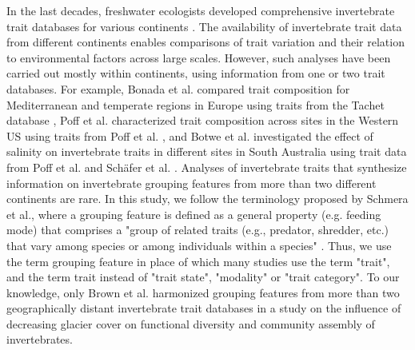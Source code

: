 \documentclass{article}
\begin{document}
In the last decades, freshwater ecologists developed comprehensive invertebrate trait databases for various continents \cite{usseglio-polatera_biomonitoring_2000, schmidt-kloiber_www.freshwaterecology.info_2015, vieira_database_nodate, Philips_and_Smith_NZ_DB_2018, kefford_integrated_2020, tomanova_trophic_2006}. The availability of invertebrate trait data from different continents enables comparisons of trait variation and their relation to environmental factors across large scales. However, such analyses have been carried out mostly within continents, using information from one or two trait databases. For example, Bonada et al. \cite{bonada_taxonomic_2007} compared trait composition for Mediterranean and temperate regions in Europe using traits from the Tachet database \cite{usseglio-polatera_biomonitoring_2000}, Poff et al. \cite{poff_developing_2010} characterized trait composition across sites in the Western US using traits from Poff et al. \cite{poff_functional_2006}, and Botwe et al. \cite{botwe_effects_2018} investigated the effect of salinity on invertebrate traits in different sites in South Australia using trait data from Poff et al. \cite{poff_functional_2006} and Schäfer et al. \cite{schafer_trait_2011}. Analyses of invertebrate traits that synthesize information on invertebrate grouping features from more than two different continents are rare. 
In this study, we follow the terminology proposed by Schmera et al., where a grouping feature is defined as a general property (e.g. feeding mode) that comprises a "group of related traits (e.g., predator, shredder, etc.) that vary among species or among individuals within a species" \cite{schmera_proposed_2015}. Thus, we use the term grouping feature in place of which many studies use the term "trait", and the term trait instead of "trait state", "modality" or "trait category". 
To our knowledge, only Brown et al. \cite{brown_functional_2018} harmonized grouping features from more than two geographically distant invertebrate trait databases in a study on the influence of decreasing glacier cover on functional diversity and community assembly of invertebrates. 
\end{document}
